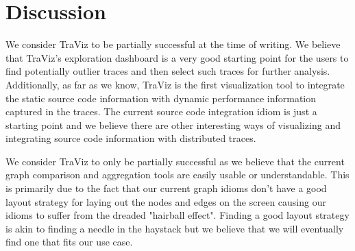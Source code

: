 \section{Discussion}

We consider TraViz to be partially successful at the time of writing.
We believe that TraViz's exploration dashboard is a very good starting
point for the users to find potentially outlier traces and then select
such traces for further analysis. Additionally, as far as we know, TraViz
is the first visualization tool to integrate the static source code
information with dynamic performance information captured in the traces.
The current source code integration idiom is just a starting point
and we believe there are other interesting ways of visualizing and integrating
source code information with distributed traces.

We consider TraViz to only be partially successful as we believe
that the current graph comparison and aggregation tools are easily
usable or understandable. This is primarily due to the fact that
our current graph idioms don't have a good layout strategy for laying
out the nodes and edges on the screen causing our idioms to suffer from
the dreaded "hairball effect".
Finding a good layout strategy
is akin to finding a needle in the haystack but we believe
that we will eventually find one that fits our use case.